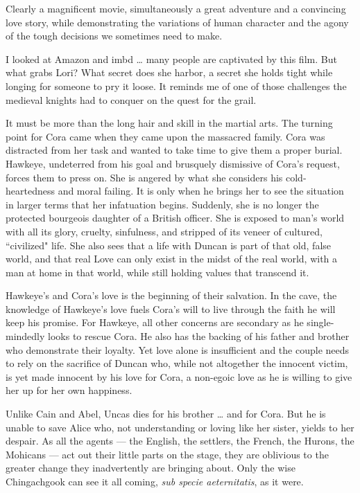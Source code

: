\begin{quotex}
Clearly a magnificent movie, simultaneously a great adventure and a convincing love story, while demonstrating the variations of human character and the agony of the tough decisions we sometimes need to make.

I looked at Amazon and imbd … many people are captivated by this film. But what grabs Lori? What secret does she harbor, a secret she holds tight while longing for someone to pry it loose. It reminds me of one of those challenges the medieval knights had to conquer on the quest for the grail.

It must be more than the long hair and skill in the martial arts. The turning point for Cora came when they came upon the massacred family. Cora was distracted from her task and wanted to take time to give them a proper burial. Hawkeye, undeterred from his goal and brusquely dismissive of Cora's request, forces them to press on. She is angered by what she considers his cold-heartedness and moral failing. It is only when he brings her to see the situation in larger terms that her infatuation begins. Suddenly, she is no longer the protected bourgeois daughter of a British officer. She is exposed to man's world with all its glory, cruelty, sinfulness, and stripped of its veneer of cultured, ``civilized" life. She also sees that a life with Duncan is part of that old, false world, and that real Love can only exist in the midst of the real world, with a man at home in that world, while still holding values that transcend it.

Hawkeye's and Cora's love is the beginning of their salvation. In the cave, the knowledge of Hawkeye's love fuels Cora's will to live through the faith he will keep his promise. For Hawkeye, all other concerns are secondary as he single-mindedly looks to rescue Cora. He also has the backing of his father and brother who demonstrate their loyalty. Yet love alone is insufficient and the couple needs to rely on the sacrifice of Duncan who, while not altogether the innocent victim, is yet made innocent by his love for Cora, a non-egoic love as he is willing to give her up for her own happiness.

Unlike Cain and Abel, Uncas dies for his brother … and for Cora. But he is unable to save Alice who, not understanding or loving like her sister, yields to her despair. As all the agents — the English, the settlers, the French, the Hurons, the Mohicans — act out their little parts on the stage, they are oblivious to the greater change they inadvertently are bringing about. Only the wise Chingachgook can see it all coming, \emph{sub specie aeternitatis}, as it were. 

\end{quotex}
